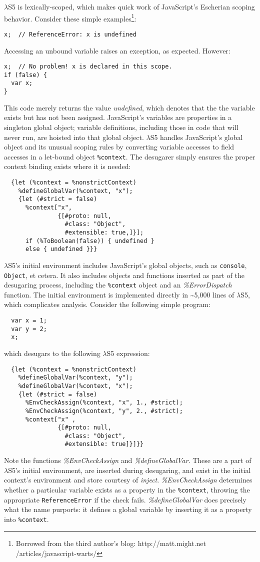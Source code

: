 \documentclass[preprint,9pt]{sigplanconf} %
\begin{document}
$\lambda$S5 is lexically-scoped, which makes quick work of
JavaScript's Escherian scoping behavior. Consider these simple
examples\footnote{Borrowed from the third author's blog:
  http://matt.might.net /articles/javascript-warts/}:
\begin{verbatim}
x;  // ReferenceError: x is undefined
\end{verbatim}
Accessing an unbound variable raises an exception, as
expected. However:
\begin{verbatim}
x;  // No problem! x is declared in this scope.
if (false) {
  var x;
}
\end{verbatim}
This code merely returns the value \emph{undefined}, which denotes
that the the variable exists but has not been assigned. JavaScript's
variables are properties in a singleton global object; variable
definitions, including those in code that will never run, are hoisted
into that global object. $\lambda$S5 handles JavaScript's global
object and its unusual scoping rules by converting variable accesses
to field accesses in a let-bound object \texttt{\%context}. The
desugarer simply ensures the proper context binding exists where it is
needed:
\begin{verbatim}
  {let (%context = %nonstrictContext)
    %defineGlobalVar(%context, "x");
    {let (#strict = false)
      %context["x",
               {[#proto: null,
                 #class: "Object",
                 #extensible: true,]}];
      if (%ToBoolean(false)) { undefined }
      else { undefined }}}
\end{verbatim}

$\lambda$S5's initial environment includes JavaScript's global
objects, such as \texttt{console}, \texttt{Object}, et cetera. It also
includes objects and functions inserted as part of the desugaring
process, including the \texttt{\%context} object and an
\emph{\%ErrorDispatch} function. The initial environment is
implemented directly in \textasciitilde5,000 lines of $\lambda$S5,
which complicates analysis. Consider the following simple program:
\begin{verbatim}
  var x = 1;
  var y = 2;
  x;
\end{verbatim}
which desugars to the following $\lambda$S5 expression:
\begin{verbatim}
  {let (%context = %nonstrictContext)
    %defineGlobalVar(%context, "y");
    %defineGlobalVar(%context, "x");
    {let (#strict = false)
      %EnvCheckAssign(%context, "x", 1., #strict);
      %EnvCheckAssign(%context, "y", 2., #strict);
      %context["x" ,
               {[#proto: null,
                 #class: "Object",
                 #extensible: true]}]}}
\end{verbatim}
Note the functions \emph{\%EnvCheckAssign} and
\emph{\%defineGlobalVar}. These are a part of $\lambda$S5's initial
environment, are inserted during desugaring, and exist in the initial
context's environment and store courtesy of
\emph{inject}. \emph{\%EnvCheckAssign} determines whether a particular
variable exists as a property in the \texttt{\%context}, throwing the
appropriate \texttt{ReferenceError} if the check
fails. \emph{\%defineGlobalVar} does precisely what the name purports:
it defines a global variable by inserting it as a property into
\texttt{\%context}.
\end{document}

